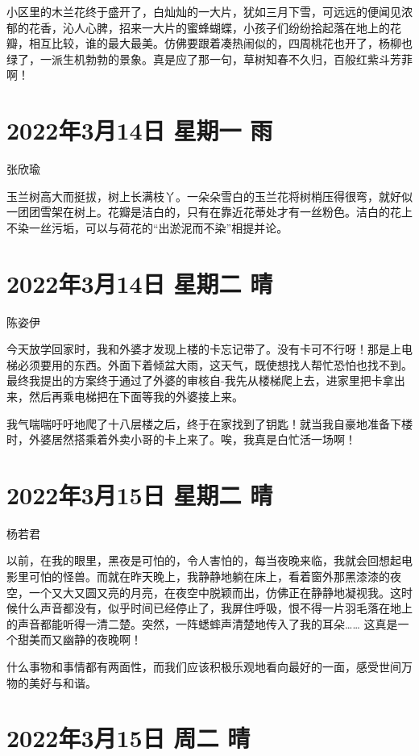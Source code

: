 小区里的木兰花终于盛开了，白灿灿的一大片，犹如三月下雪，可远远的便闻见浓郁的花香，沁人心脾，招来一大片的蜜蜂蝴蝶，小孩子们纷纷拾起落在地上的花瓣，相互比较，谁的最大最美。仿佛要跟着凑热闹似的，四周桃花也开了，杨柳也绿了，一派生机勃勃的景象。真是应了那一句，草树知春不久归，百般红紫斗芳菲啊！

\section{2022年3月14日 星期一 雨}

张欣瑜

玉兰树高大而挺拔，树上长满枝丫。一朵朵雪白的玉兰花将树梢压得很弯，就好似一团团雪架在树上。花瓣是洁白的，只有在靠近花蒂处才有一丝粉色。洁白的花上不染一丝污垢，可以与荷花的“出淤泥而不染”相提并论。

\section{2022年3月14日 星期二 晴}

陈姿伊

今天放学回家时，我和外婆才发现上楼的卡忘记带了。没有卡可不行呀！那是上电梯必须要用的东西。外面下着倾盆大雨，这天气，既使想找人帮忙恐怕也找不到。最终我提出的方案终于通过了外婆的审核自-我先从楼梯爬上去，进家里把卡拿出来，然后再乘电梯把在下面等我的外婆接上来。

我气喘喘吁吁地爬了十八层楼之后，终于在家找到了钥匙！就当我自豪地准备下楼时，外婆居然搭乘着外卖小哥的卡上来了。唉，我真是白忙活一场啊！

\section{2022年3月15日 星期二 晴}

杨若君

以前，在我的眼里，黑夜是可怕的，令人害怕的，每当夜晚来临，我就会回想起电影里可怕的怪兽。而就在昨天晚上，我静静地躺在床上，看着窗外那黑漆漆的夜空，一个又大又圆又亮的月亮，在夜空中脱颖而出，仿佛正在静静地凝视我。这时候什么声音都没有，似乎时间已经停止了，我屏住呼吸，恨不得一片羽毛落在地上的声音都能听得一清二楚。突然，一阵蟋蟀声清楚地传入了我的耳朵…… 这真是一个甜美而又幽静的夜晚啊！

什么事物和事情都有两面性，而我们应该积极乐观地看向最好的一面，感受世间万物的美好与和谐。

\section{2022年3月15日 周二 晴}

